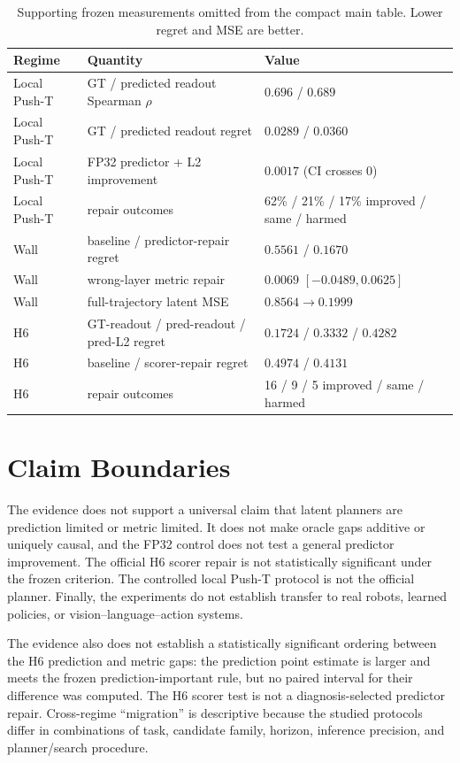 \begin{table}[H]
  \caption{Supporting frozen measurements omitted from the compact main table. Lower regret and MSE are better.}
  \label{tab:additional}
  \centering
  \small
  \begin{tabular}{@{}lll@{}}
    \toprule
    Regime & Quantity & Value \\
    \midrule
    Local Push-T & GT / predicted readout Spearman $\rho$ & $0.696$ / $0.689$ \\
    Local Push-T & GT / predicted readout regret & $0.0289$ / $0.0360$ \\
    Local Push-T & FP32 predictor + L2 improvement & $0.0017$ (CI crosses 0) \\
    Local Push-T & repair outcomes & 62\% / 21\% / 17\% improved / same / harmed \\
    Wall & baseline / predictor-repair regret & $0.5561$ / $0.1670$ \\
    Wall & wrong-layer metric repair & $0.0069$ $[-0.0489,0.0625]$ \\
    Wall & full-trajectory latent MSE & $0.8564\rightarrow0.1999$ \\
    H6 & GT-readout / pred-readout / pred-L2 regret & $0.1724$ / $0.3332$ / $0.4282$ \\
    H6 & baseline / scorer-repair regret & $0.4974$ / $0.4131$ \\
    H6 & repair outcomes & 16 / 9 / 5 improved / same / harmed \\
    \bottomrule
  \end{tabular}
\end{table}

\section{Claim Boundaries}

The evidence does not support a universal claim that latent planners are prediction limited or metric limited. It does not make oracle gaps additive or uniquely causal, and the FP32 control does not test a general predictor improvement. The official H6 scorer repair is not statistically significant under the frozen criterion. The controlled local Push-T protocol is not the official planner. Finally, the experiments do not establish transfer to real robots, learned policies, or vision--language--action systems.

The evidence also does not establish a statistically significant ordering between the H6 prediction and metric gaps: the prediction point estimate is larger and meets the frozen prediction-important rule, but no paired interval for their difference was computed. The H6 scorer test is not a diagnosis-selected predictor repair. Cross-regime ``migration'' is descriptive because the studied protocols differ in combinations of task, candidate family, horizon, inference precision, and planner/search procedure.
